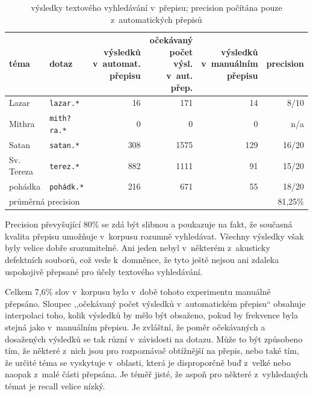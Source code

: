 \begin{table}[htpb]
\begin{center}
\begin{tabular}{|l|l|r|r|r|r|}
\hline
téma &
dotaz &
\makecell{výsledků\\ v~automat.\\ přepisu} &
\makecell{očekávaný\\ počet výsl.\\ v~aut. přep.} &
\makecell{výsledků\\ v~manuálním\\ přepisu} &
precision \\
\hline
Lazar & \texttt{lazar.*} & 16 & 171 & 14 & 8/10   \\
Mithra & \texttt{mith?ra.*} & 0 & 0 & 0 & n/a   \\
Satan & \texttt{satan.*} & 308 & 1575 & 129 & 16/20   \\
Sv. Tereza & \texttt{terez.*} & 882 & 1111 & 91 & 15/20   \\
pohádka & \texttt{pohádk.*} & 216 & 671 & 55 & 18/20   \\
\hline
\multicolumn{5}{|l|}{průměrná precision} & 81,25\%\\
\hline
\end{tabular}
\caption{výsledky textového vyhledávání v~přepisu; precision počítána pouze
z~automatických přepisů}\label{tab:topicsearch}
\end{center}
\end{table}

Precision převyšující 80\% se zdá být slibnou a poukazuje na fakt, že současná
kvalita přepisu umožňuje v~korpusu rozumně vyhledávat. Všechny výsledky však
byly velice dobře srozumitelné. Ani jeden nebyl v~některém z~akusticky
defektních souborů, což vede k~domněnce, že tyto ještě nejsou ani zdaleka
uspokojivě přepsané pro účely textového vyhledávání.

Celkem 7,6\% slov v~korpusu bylo v~době tohoto experimentu manuálně přepsáno. Sloupec ,,očekávaný počet
výsledků v~automatickém přepisu`` obsahuje interpolaci toho, kolik výsledků by
mělo být obsaženo, pokud by frekvence byla stejná jako v~manuálním přepisu. Je
zvláštní, že poměr očekávaných a dosažených výsledků se tak různí v~závislosti
na dotazu. Může to být způsobeno tím, že některé z~nich jsou pro rozpoznávač
obtížnější na přepis, nebo také tím, že určité téma se vyskytuje v~oblasti,
která je disproporčně buď z~velké nebo naopak z~malé části přepsána. Je téměř
jisté, že aspoň pro některé z~vyhledaných témat je recall velice nízký.

